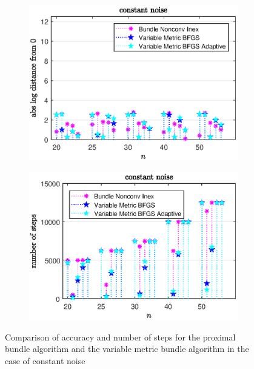 \vspace{-1.5em}

\begin{figure}[H]
	\begin{subfigure}{0.49\textwidth}
		\includegraphics[width=\textwidth]{Pictures/Plots/constant_noise_b.eps}%
	\end{subfigure}
	\begin{subfigure}{0.49\textwidth}
		\includegraphics[width=\textwidth]{Pictures/Plots/steps_constant_noise_b.eps}%
	\end{subfigure}
	\vspace{-.5em}
	\caption[Accuracy and number of steps:constant noise, higher dimensions]{Comparison of accuracy and number of steps for the proximal bundle algorithm and the variable metric bundle algorithm in the case of constant noise}%
	\label{fig_const_noise_large}%
\end{figure}

